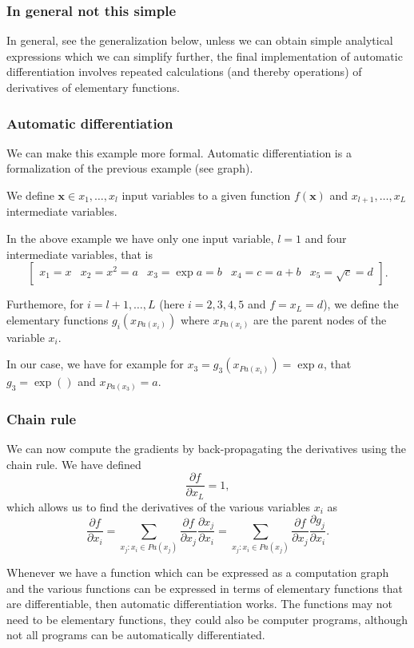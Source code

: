 \documentclass{beamer}
\begin{document}
\begin{frame}
\frametitle{In general not this simple}

In general, see the generalization below, unless we can obtain simple
analytical expressions which we can simplify further, the final
implementation of automatic differentiation involves repeated
calculations (and thereby operations) of derivatives of elementary
functions.
\end{frame}

\begin{frame}
\frametitle{Automatic differentiation}

We can make this example more formal. Automatic differentiation is a
formalization of the previous example (see graph).

We define $\bm{x}\in x_1,\dots, x_l$ input variables to a given function $f(\bm{x})$ and $x_{l+1},\dots, x_L$ intermediate variables.

In the above example we have only one input variable, $l=1$ and four intermediate variables, that is
\[
\begin{bmatrix} x_1=x & x_2 = x^2=a & x_3 =\exp{a}= b & x_4=c=a+b & x_5 = \sqrt{c}=d \end{bmatrix}.
\]

Furthemore, for $i=l+1, \dots, L$ (here $i=2,3,4,5$ and $f=x_L=d$), we
define the elementary functions $g_i(x_{Pa(x_i)})$ where $x_{Pa(x_i)}$ are the parent nodes of the variable $x_i$.

In our case, we have for example for $x_3=g_3(x_{Pa(x_i)})=\exp{a}$, that $g_3=\exp{()}$ and $x_{Pa(x_3)}=a$.
\end{frame}

\begin{frame}
\frametitle{Chain rule}

We can now compute the gradients by back-propagating the derivatives using the chain rule.
We have defined
\[
\frac{\partial f}{\partial x_L} = 1,
\]
which allows us to find the derivatives of the various variables $x_i$ as
\[
\frac{\partial f}{\partial x_i} = \sum_{x_j:x_i\in Pa(x_j)}\frac{\partial f}{\partial x_j} \frac{\partial x_j}{\partial x_i}=\sum_{x_j:x_i\in Pa(x_j)}\frac{\partial f}{\partial x_j} \frac{\partial g_j}{\partial x_i}.
\]

Whenever we have a function which can be expressed as a computation
graph and the various functions can be expressed in terms of
elementary functions that are differentiable, then automatic
differentiation works.  The functions may not need to be elementary
functions, they could also be computer programs, although not all
programs can be automatically differentiated.
\end{frame}
\end{document}

